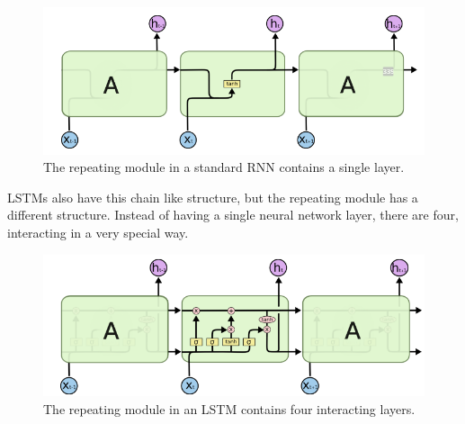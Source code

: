 \begin{figure}[H]
    \centering
    \includegraphics[width=6.5in]{images/rnnStandard.png}
    \caption{The repeating module in a standard RNN contains a single layer.}
\end{figure}

LSTMs also have this chain like structure, but the repeating module has a different structure. Instead of having a single neural network layer, there are four, interacting in a very special way.

\begin{figure}[H]
    \centering
    \includegraphics[width=6.5in]{images/lstm.png}
    \caption{The repeating module in an LSTM contains four interacting layers.}
\end{figure}
